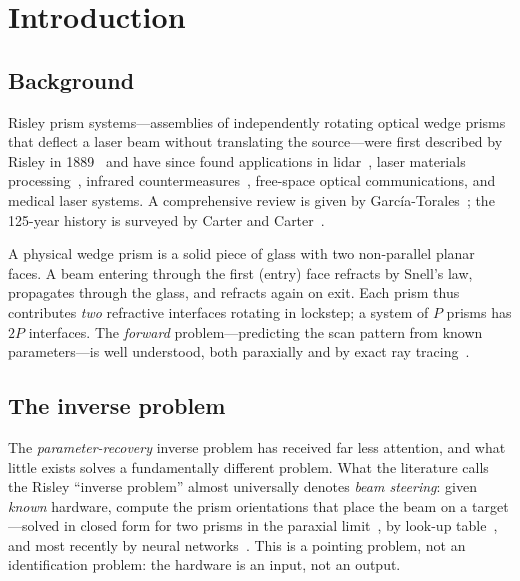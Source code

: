 \documentclass[twocolumn,preprintnumbers,amsmath,amssymb,pra,floatfix]{revtex4-2}
\begin{document}
\maketitle

\section{Introduction}
\label{sec:intro}

\subsection{Background}

Risley prism systems---assemblies of independently rotating optical wedge
prisms that deflect a laser beam without translating the source---were first
described by Risley in 1889~\cite{Risley1889} and have since found
applications in lidar~\cite{Amirault1985}, laser materials
processing~\cite{Dausinger2000,Foehl2003}, infrared
countermeasures~\cite{Bos2007}, free-space optical communications, and
medical laser systems.  A comprehensive review is given by
Garc\'ia-Torales~\cite{GarciaTorales2022}; the 125-year history is
surveyed by Carter and Carter~\cite{Carter2006}.

A physical wedge prism is a solid piece of glass with two non-parallel
planar faces.  A beam entering through the first (entry) face refracts by
Snell's law, propagates through the glass, and refracts again on exit.
Each prism thus contributes \emph{two} refractive interfaces rotating in
lockstep; a system of $P$ prisms has $2P$ interfaces.  The
\emph{forward} problem---predicting the scan pattern from known
parameters---is well understood, both paraxially
\cite{Shaomin1985,Yang2008,Li2011} and by exact ray
tracing~\cite{Marshall1999,Schitea2013,Duma2021}.

\subsection{The inverse problem}

The \emph{parameter-recovery} inverse problem has received far less
attention, and what little exists solves a fundamentally different
problem.  What the literature calls the Risley ``inverse problem''
almost universally denotes \emph{beam steering}: given \emph{known}
hardware, compute the prism orientations that place the beam on a
target---solved in closed form for two prisms in the paraxial
limit~\cite{Yang2008}, by look-up table~\cite{Ostaszewski2006}, and most
recently by neural networks~\cite{Li2024,Yan2026}.  This is a pointing
problem, not an identification problem: the hardware is an input, not an
output.
\end{document}
